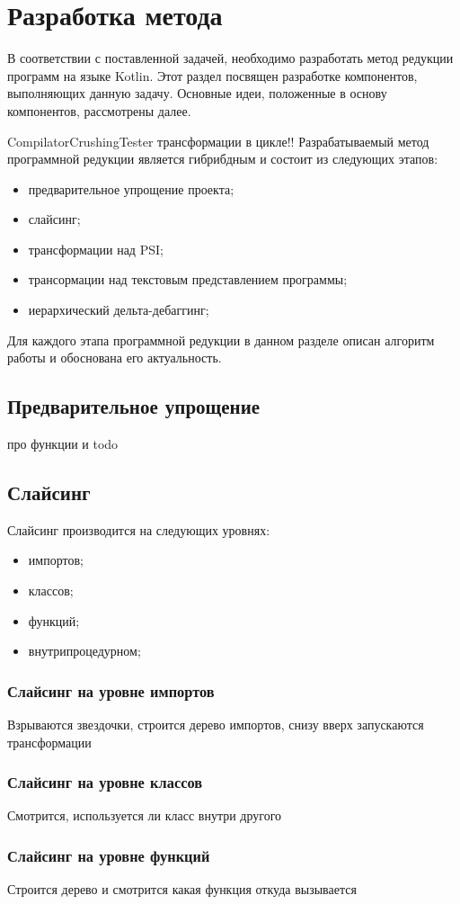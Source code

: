 \chapter{Разработка метода}
В соответствии с поставленной задачей, необходимо разработать метод редукции программ на языке Kotlin. Этот раздел посвящен разработке компонентов, выполняющих данную задачу. Основные идеи, положенные в основу компонентов, рассмотрены далее.

CompilatorCrushingTester
трансформации в цикле!!
Разрабатываемый метод программной редукции является гибрибдным и состоит из следующих этапов:
\begin{itemize}
	\item предварительное упрощение проекта;
	\item слайсинг;
	\item трансформации над PSI;
	\item трансормации над текстовым представлением программы;
	\item иерархический дельта-дебаггинг;
\end{itemize}
Для каждого этапа программной редукции в данном разделе описан алгоритм работы и обоснована его актуальность.

\section{Предварительное упрощение}
про функции и todo
\section{Слайсинг}
Слайсинг производится на следующих уровнях:
\begin{itemize}
	\item импортов;
	\item классов;
	\item функций;
	\item внутрипроцедурном;
\end{itemize}
\subsection{Слайсинг на уровне импортов}
Взрываются звездочки, строится дерево импортов, снизу вверх запускаются трансформации
\subsection{Слайсинг на уровне классов}
Смотрится, используется ли класс внутри другого
\subsection{Слайсинг на уровне функций}
Строится дерево и смотрится какая функция откуда вызывается
